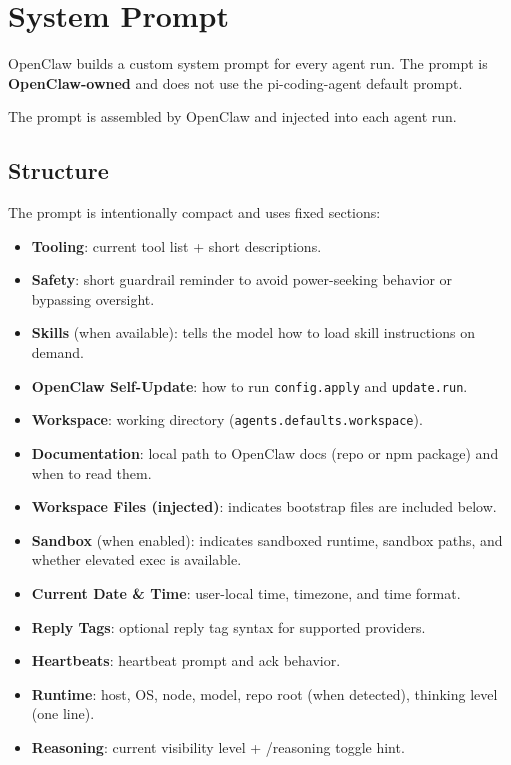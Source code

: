 \clearpage

\section{System Prompt}


OpenClaw builds a custom system prompt for every agent run. The prompt is \textbf{OpenClaw-owned} and does not use the pi-coding-agent default prompt.

The prompt is assembled by OpenClaw and injected into each agent run.

\subsection{Structure}


The prompt is intentionally compact and uses fixed sections:

\begin{itemize}
  \item \textbf{Tooling}: current tool list + short descriptions.
  \item \textbf{Safety}: short guardrail reminder to avoid power-seeking behavior or bypassing oversight.
  \item \textbf{Skills} (when available): tells the model how to load skill instructions on demand.
  \item \textbf{OpenClaw Self-Update}: how to run \texttt{config.apply} and \texttt{update.run}.
  \item \textbf{Workspace}: working directory (\texttt{agents.defaults.workspace}).
  \item \textbf{Documentation}: local path to OpenClaw docs (repo or npm package) and when to read them.
  \item \textbf{Workspace Files (injected)}: indicates bootstrap files are included below.
  \item \textbf{Sandbox} (when enabled): indicates sandboxed runtime, sandbox paths, and whether elevated exec is available.
  \item \textbf{Current Date \& Time}: user-local time, timezone, and time format.
  \item \textbf{Reply Tags}: optional reply tag syntax for supported providers.
  \item \textbf{Heartbeats}: heartbeat prompt and ack behavior.
  \item \textbf{Runtime}: host, OS, node, model, repo root (when detected), thinking level (one line).
  \item \textbf{Reasoning}: current visibility level + /reasoning toggle hint.
\end{itemize}


